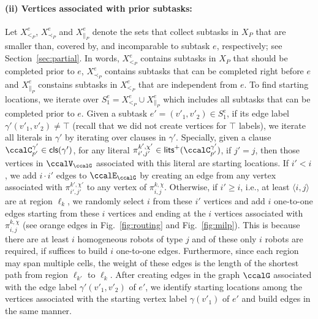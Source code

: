 \documentclass[Afour,sageh,times]{sagej}
\newcommand{\clause}[1]{\mathsf{cls}(#1)}
\newcommand{\ag}[2]{\langle#1,#2\rangle}
\renewcommand{\ap}[3]{\mathcal{\pi}_{{#1},{#2}}^{#3}}
\begin{document}
\paragraph{(ii) Vertices associated with prior subtasks:}\label{sec:b} Let $X^e_{<_{P}}$, $X^e_{\prec_{P}}$ and $X^e_{\|_{P}}$ denote the sets that collect subtasks in $X_{P}$ that are  smaller than, covered by, and incomparable to subtask $e$, respectively; see Section~\ref{sec:partial}. In words, $X^e_{<_{P}}$ contains subtasks in $X_P$ that should be completed prior to $e$, $X^e_{\prec_{P}}$ contains subtasks that can be completed right before $e$  and $X^e_{\|_{P}}$ constains subtasks in  $X^e_{<_P}$ that are independent from $e$. To find starting locations, we iterate over $S_1^e = X^e_{<_{P}} \cup X^e_{\|_{P}}$ which includes all subtasks that can be completed prior to $e$.
Given a subtask $e' = (v'_1, v'_2) \in S_1^e$, if its edge label $\gamma'(v'_1, v'_2) \not=\top$ (recall that we did not create vertices for $\top$ labels), we iterate all literals in $\gamma'$ by iterating over clauses in $\gamma'$. Specially, given a clause $\ccalC^{\gamma'}_{p'} \in \clause{\gamma'}$, for any literal $\ap{i'}{j'}{k',\chi'} \in\mathsf{lits}^+(\ccalC^{\gamma'}_{p'})$, if $j'=j$, then those vertices in $\ccalV_\ccalG$ associated with this literal are starting locations. If $i'<i$, we add $i\cdot  i'$ edges to $\ccalE_\ccalG$ by creating an edge from any vertex associated with $\ap{i'}{j'}{k',\chi'}$ to any vertex of $\ap{i}{j}{k,\chi}$. Otherwise, if $i' \geq  i$, i.e., at least $\ag{i}{j}$ are at region $\ell_k$, we randomly select $i$ from these $i'$ vertices and add $i$ one-to-one edges starting from these $i$ vertices and ending at the $i$ vertices associated with $\ap{i}{j}{k,\chi}$ (see orange edges in Fig.~\ref{fig:routing} and Fig.~\ref{fig:milp}). This is because there are at least $i$ homogeneous robots of type $j$ and of these only $i$ robots are required, if suffices to build $i$ one-to-one edges. Furthermore, since each region may span multiple cells, the weight of these edges is the length of the shortest path from region  $\ell_{k'}$ to $\ell_k$.  After creating edges in the graph $\ccalG$ associated with the edge label  $\gamma'(v'_1,v'_2)$ of $e'$, we identify  starting locations among the vertices associated with the starting vertex label $\gamma(v'_1)$ of $e'$ and build edges in the same manner. %
\end{document}
